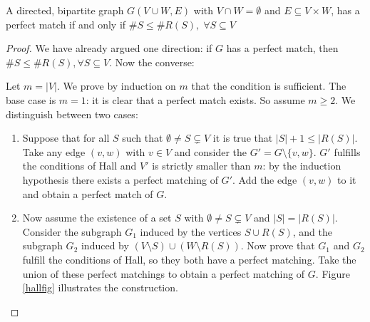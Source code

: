  \begin{theorem}

A directed, bipartite graph $G(V \cup W,E)$ with $V \cap W =
\emptyset$ and $E \subseteq V \times W$, has a perfect match if and
only if $\#S \leq \#R(S),\; \forall S \subseteq V$
\end{theorem}
\begin{proof}
We have already argued one direction: if $G$ has a perfect match, then
$\#S \leq \#R(S), \forall S \subseteq V$. Now the converse:

Let $m = |V|$. We prove by induction on $m$ that the condition is
sufficient. The base case is $m=1$: it is clear that a perfect match
exists. So assume $m \geq 2$. We distinguish between two cases:


\begin{enumerate}
\item
Suppose that for all $S$ such that $\emptyset \neq S \subsetneq V$ it
is true that $|S| + 1 \leq |R(S)|$. Take any edge $(v,w)$ with $v \in
V$ and consider the $G' = G \setminus \{v,w\}$. $G'$ fulfills the
conditions of Hall and $V'$ is strictly smaller than $m$: by the
induction hypothesis there exists a perfect matching of $G'$. Add the
edge $(v,w)$ to it and obtain a perfect match of $G$.

\item
Now assume the existence of a set $S$ with $\emptyset \neq S
\subsetneq V$ and $|S| = |R(S)|$. Consider the subgraph $G_1$ induced
by the vertices $S \cup R(S)$, and the subgraph $G_2$ induced by
$(V\setminus S) \cup (W \setminus R(S))$. Now prove that $G_1$ and
$G_2$ fulfill the conditions of Hall, so they both have a perfect
matching. Take the union of these perfect matchings to obtain a perfect
matching of $G$. Figure \ref{hallfig} illustrates the construction.
\end{enumerate}
\end{proof}

